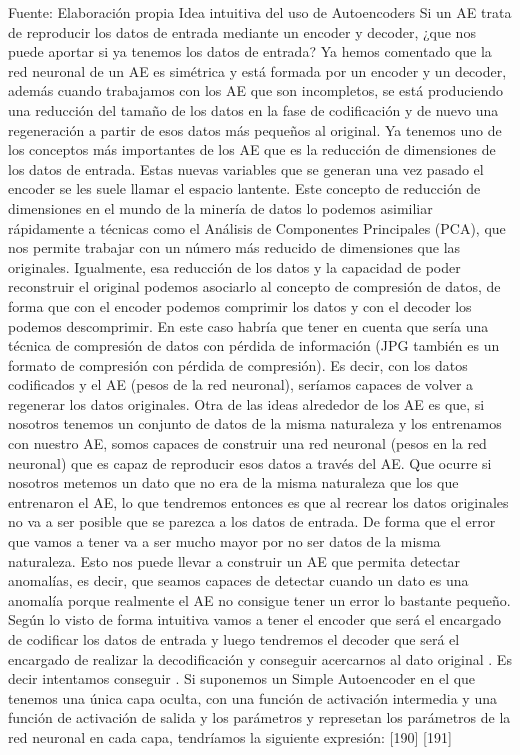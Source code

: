 \documentclass[
  a4paper,
  DIV=11,
  numbers=noendperiod]{scrreprt}
\begin{document}
Fuente: Elaboración propia Idea intuitiva del uso de Autoencoders Si un
AE trata de reproducir los datos de entrada mediante un encoder y
decoder, ¿que nos puede aportar si ya tenemos los datos de entrada? Ya
hemos comentado que la red neuronal de un AE es simétrica y está formada
por un encoder y un decoder, además cuando trabajamos con los AE que son
incompletos, se está produciendo una reducción del tamaño de los datos
en la fase de codificación y de nuevo una regeneración a partir de esos
datos más pequeños al original. Ya tenemos uno de los conceptos más
importantes de los AE que es la reducción de dimensiones de los datos de
entrada. Estas nuevas variables que se generan una vez pasado el encoder
se les suele llamar el espacio lantente. Este concepto de reducción de
dimensiones en el mundo de la minería de datos lo podemos asimiliar
rápidamente a técnicas como el Análisis de Componentes Principales
(PCA), que nos permite trabajar con un número más reducido de
dimensiones que las originales. Igualmente, esa reducción de los datos y
la capacidad de poder reconstruir el original podemos asociarlo al
concepto de compresión de datos, de forma que con el encoder podemos
comprimir los datos y con el decoder los podemos descomprimir. En este
caso habría que tener en cuenta que sería una técnica de compresión de
datos con pérdida de información (JPG también es un formato de
compresión con pérdida de compresión). Es decir, con los datos
codificados y el AE (pesos de la red neuronal), seríamos capaces de
volver a regenerar los datos originales. Otra de las ideas alrededor de
los AE es que, si nosotros tenemos un conjunto de datos de la misma
naturaleza y los entrenamos con nuestro AE, somos capaces de construir
una red neuronal (pesos en la red neuronal) que es capaz de reproducir
esos datos a través del AE. Que ocurre si nosotros metemos un dato que
no era de la misma naturaleza que los que entrenaron el AE, lo que
tendremos entonces es que al recrear los datos originales no va a ser
posible que se parezca a los datos de entrada. De forma que el error que
vamos a tener va a ser mucho mayor por no ser datos de la misma
naturaleza. Esto nos puede llevar a construir un AE que permita detectar
anomalías, es decir, que seamos capaces de detectar cuando un dato es
una anomalía porque realmente el AE no consigue tener un error lo
bastante pequeño. Según lo visto de forma intuitiva vamos a tener el
encoder que será el encargado de codificar los datos de entrada y luego
tendremos el decoder que será el encargado de realizar la decodificación
y conseguir acercarnos al dato original . Es decir intentamos conseguir
. Si suponemos un Simple Autoencoder en el que tenemos una única capa
oculta, con una función de activación intermedia y una función de
activación de salida y los parámetros y represetan los parámetros de la
red neuronal en cada capa, tendríamos la siguiente expresión: {[}190{]}
{[}191{]}
\end{document}
